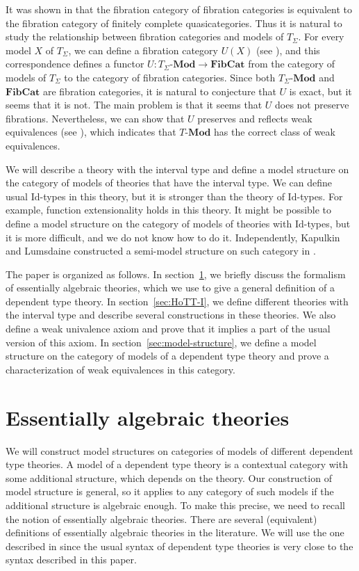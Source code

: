 \documentclass{mscs}
\newcommand{\Id}{\mathrm{Id}}
\newcommand{\cat}[1]{\mathbf{#1}}
\newcommand{\Mod}[1]{#1\text{-}\cat{Mod}}
\numberwithin{figure}{section}
\begin{document}
It was shown in \cite{szumilo} that the fibration category of fibration categories is equivalent to the fibration category of finitely complete quasicategories.
Thus it is natural to study the relationship between fibration categories and models of $T_\Sigma$.
For every model $X$ of $T_\Sigma$, we can define a fibration category $U(X)$ (see \cite{tt-fibr-cat}), and this correspondence defines a functor $U : \Mod{T_\Sigma} \to \cat{FibCat}$
from the category of models of $T_\Sigma$ to the category of fibration categories.
Since both $\Mod{T_\Sigma}$ and $\cat{FibCat}$ are fibration categories, it is natural to conjecture that $U$ is exact, but it seems that it is not.
The main problem is that it seems that $U$ does not preserve fibrations.
Nevertheless, we can show that $U$ preserves and reflects weak equivalences (see ), which indicates that $\Mod{T}$ has the correct class of weak equivalences.

We will describe a theory with the interval type and define a model structure on the category of models of theories that have the interval type.
We can define usual $\Id$-types in this theory, but it is stronger than the theory of $\Id$-types.
For example, function extensionality holds in this theory.
It might be possible to define a model structure on the category of models of theories with $\Id$-types,
but it is more difficult, and we do not know how to do it.
Independently, Kapulkin and Lumsdaine constructed a semi-model structure on such category in \cite{kap-lum-model}.

The paper is organized as follows.
In section~\ref{sec:alg-th}, we briefly discuss the formalism of essentially algebraic theories, which we use to give a general definition of a dependent type theory.
In section~\ref{sec:HoTT-I}, we define different theories with the interval type and describe several constructions in these theories.
We also define a weak univalence axiom and prove that it implies a part of the usual version of this axiom.
In section~\ref{sec:model-structure}, we define a model structure on the category of models of a dependent type theory
and prove a characterization of weak equivalences in this category.

\section{Essentially algebraic theories}
\label{sec:alg-th}

We will construct model structures on categories of models of different dependent type theories.
A model of a dependent type theory is a contextual category with some additional structure, which depends on the theory.
Our construction of model structure is general, so it applies to any category of such models if the additional structure is algebraic enough.
To make this precise, we need to recall the notion of essentially algebraic theories.
There are several (equivalent) definitions of essentially algebraic theories in the literature.
We will use the one described in \cite{PHL} since the usual syntax of dependent type theories is very close to the syntax described in this paper.
\end{document}
